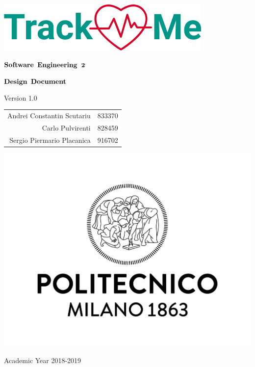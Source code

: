 \documentclass[oneside]{article}
\date{}
\title{}
\begin{document}

\thispagestyle{empty} %
\begin{center}
	\includegraphics[scale=0.8]{images/mockup/logo2.png}



	\vspace{3cm}

	\large $\bf \large Software$ $\bf Engineering$ $\bf 2$

	\vspace{3mm}

	\LARGE $\bf Design$  $\bf Document$

	\vspace{2mm}
	\small Version 1.0

	\vspace{1cm}

	\begin{tabular}{r|l}
		\large Andrei Constantin Scutariu & \large 833370\\
		\large Carlo Pulvirenti & \large 828459\\
		\large Sergio Piermario Placanica & \large 916702\\
	\end{tabular}

	\vspace{3cm}

	\includegraphics[scale=0.15]{images/logoPolimi.jpg}

	\vspace{3mm}
	Academic Year 2018-2019


	\end{center}
\end{document}

